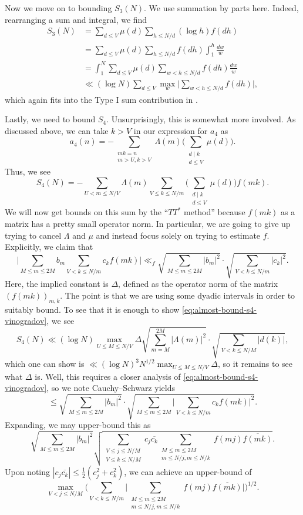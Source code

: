 \documentclass[../notes.tex]{subfiles}
\begin{document}
Now we move on to bounding $S_3(N)$. We use summation by parts here. Indeed, rearranging a sum and integral, we find
\begin{align*}
	S_3(N) &= \sum_{d\le V}\mu(d)\sum_{h\le N/d}(\log h)f(dh) \\
	&= \sum_{d\le V}\mu(d)\sum_{h\le N/d}f(dh)\int_1^h\frac{dw}w \\
	&= \int_1^N\sum_{d\le V}\mu(d)\sum_{w<h\le N/d}f(dh)\frac{dw}w \\
	&\ll(\log N)\sum_{d\le V}\max_w\Bigg|\sum_{w<h\le N/d}f(dh)\Bigg|,
\end{align*}
which again fits into the Type I sum contribution in .

Lastly, we need to bound $S_4$. Unsurprisingly, this is somewhat more involved. As discussed above, we can take $k>V$ in our expression for $a_4$ as
\[a_4(n)=-\sum_{\substack{mk=n\\m>U,k>V}}\Lambda(m)\Bigg(\sum_{\substack{d\mid k\\d\le V}}\mu(d)\Bigg).\]
Thus, we see
\[S_4(N)=-\sum_{U<m\le N/V}\Lambda(m)\sum_{V\le k\le N/m}\Bigg(\sum_{\substack{d\mid k\\d\le V}}\mu(d)\Bigg)f(mk).\]
We will now get bounds on this sum by the ``$TT^*$ method'' because $f(mk)$ as a matrix has a pretty small operator norm. In particular, we are going to give up trying to cancel $\Lambda$ and $\mu$ and instead focus solely on trying to estimate $f$. Explicitly, we claim that
\begin{equation}
	\Bigg|\sum_{M\le m\le2M}b_m\sum_{V<k\le N/m}c_kf(mk)\Bigg|\ll_f\sqrt{\sum_{M\le m\le2M}|b_m|^2}\cdot\sqrt{\sum_{V<k\le N/m}|c_k|^2}. \label{eq:almost-bound-s4-vinogradov}
\end{equation}
Here, the implied constant is $\Delta$, defined as the operator norm of the matrix $(f(mk))_{m,k}$. The point is that we are using some dyadic intervals in order to suitably bound. To see that it is enough to show \eqref{eq:almost-bound-s4-vinogradov}, we see
\[S_4(N)\ll(\log N)\max_{U\le M\le N/V}\Delta\sqrt{\sum_{m=M}^{2M}|\Lambda(m)|^2}\cdot\sqrt{\sum_{V<k\le N/M}|d(k)|},\]
which one can show is $\ll(\log N)^3N^{1/2}\max_{U\le M\le N/V}\Delta$, so it remains to see what $\Delta$ is. Well, this requires a closer analysis of \eqref{eq:almost-bound-s4-vinogradov}, so we note Cauchy--Schwarz yields
\[\le\sqrt{\sum_{M\le m\le2M}|b_m|^2}\cdot\sqrt{\sum_{M\le m\le2M}\Bigg|\sum_{V<k\le N/m}c_kf(mk)\Bigg|^2}.\]
Expanding, we may upper-bound this as
\[\sqrt{\sum_{M\le m\le2M}|b_m|^2}\sqrt{\sum_{\substack{V\le j\le N/M\\V\le k\le N/M}}c_j\overline{c_k}\sum_{\substack{M\le m\le2M\\m\le N/j,m\le N/k}}f(mj)\overline{f(mk)}}.\]
Upon noting $|c_j\overline{c_k}|\le\frac12\left(c_j^2+c_k^2\right)$, we can achieve an upper-bound of
\[\max_{V<j\le N/M}\Bigg(\sum_{V<k\le N/m}\Bigg|\sum_{\substack{M\le m\le2M\\m\le N/j,m\le N/k}}f(mj)\overline{f(mk)}\Bigg|\Bigg)^{1/2}.\]
\end{document}
